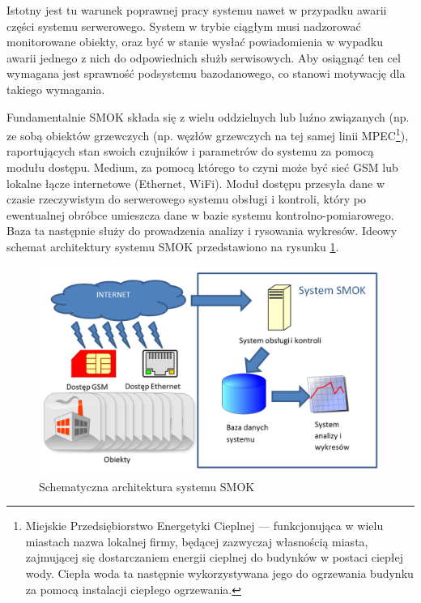 \documentclass[a4paper,polish,12pt,twoside]{article}
\begin{document}
Istotny jest tu warunek poprawnej pracy systemu nawet w przypadku awarii części systemu serwerowego. System w trybie ciągłym musi nadzorować monitorowane obiekty, oraz być w stanie wysłać powiadomienia w wypadku awarii jednego z nich do odpowiednich służb serwisowych. Aby osiągnąć ten cel wymagana jest sprawność podsystemu bazodanowego, co stanowi motywację dla takiego wymagania.

Fundamentalnie SMOK składa się z wielu oddzielnych lub luźno związanych (np. ze sobą obiektów grzewczych (np. węzłów grzewczych na tej samej linii MPEC\footnote{Miejskie Przedsiębiorstwo Energetyki Cieplnej --- funkcjonująca w wielu miastach nazwa lokalnej firmy, będącej zazwyczaj własnością miasta, zajmującej się dostarczaniem energii cieplnej do budynków w postaci ciepłej wody. Ciepła woda ta następnie wykorzystywana jego do ogrzewania budynku za pomocą instalacji ciepłego ogrzewania.}), raportujących stan swoich czujników i parametrów do systemu za pomocą modułu dostępu. Medium, za pomocą którego to czyni może być sieć GSM lub lokalne łącze internetowe (Ethernet, WiFi). Moduł dostępu przesyła dane w czasie rzeczywistym do serwerowego systemu obsługi i kontroli, który po ewentualnej obróbce umieszcza dane w bazie systemu kontrolno-pomiarowego. Baza ta następnie służy do prowadzenia analizy i rysowania wykresów. Ideowy schemat architektury systemu SMOK przedstawiono na rysunku \ref{fig:smok_architecture}.

	\begin{figure}[h]
		\centering \includegraphics[width=15cm]{smok_architecture}
		\caption{Schematyczna architektura systemu SMOK}
		\label{fig:smok_architecture}
	\end{figure}
\end{document}
